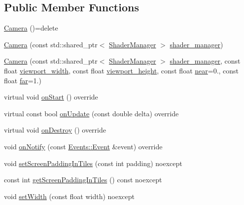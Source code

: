 \subsection*{Public Member Functions}
\begin{DoxyCompactItemize}
\item 
\hyperlink{class_graphics_1_1_camera_a357a2294fe254fc1dd24061336f7fef9}{Camera} ()=delete
\item 
\hyperlink{class_graphics_1_1_camera_a4974bc917c6e7db4a9429e5ce3673b14}{Camera} (const std\+::shared\+\_\+ptr$<$ \hyperlink{class_graphics_1_1_shader_manager}{Shader\+Manager} $>$ \hyperlink{class_graphics_1_1_camera_a60d25d91283365ea01a54a81e0f9246b}{shader\+\_\+manager})
\item 
\hyperlink{class_graphics_1_1_camera_aef6471ed249e435e25bb80bbafad31cf}{Camera} (const std\+::shared\+\_\+ptr$<$ \hyperlink{class_graphics_1_1_shader_manager}{Shader\+Manager} $>$ \hyperlink{class_graphics_1_1_camera_a60d25d91283365ea01a54a81e0f9246b}{shader\+\_\+manager}, const float \hyperlink{class_graphics_1_1_camera_ae08e862d5cf284a8d28a5b5bebdf1d33}{viewport\+\_\+width}, const float \hyperlink{class_graphics_1_1_camera_acc8b30298da1779394bbafb91f5a7855}{viewport\+\_\+height}, const float \hyperlink{class_graphics_1_1_camera_ad4c61e1382447826985b5a5445379375}{near}=0., const float \hyperlink{class_graphics_1_1_camera_a1d6d4c2d74d4d25ef66900bf603e88af}{far}=1.)
\item 
virtual void \hyperlink{class_graphics_1_1_camera_a37edadff497ff3966c2190b876bfe236}{on\+Start} () override
\item 
virtual const bool \hyperlink{class_graphics_1_1_camera_a0bfccb5623342c93f69b408937b87374}{on\+Update} (const double delta) override
\item 
virtual void \hyperlink{class_graphics_1_1_camera_a9d8ca67cbd7a586915fc6cfd303406de}{on\+Destroy} () override
\item 
void \hyperlink{class_graphics_1_1_camera_afd1785008e1ee71690749bf99a5d1e9a}{on\+Notify} (const \hyperlink{class_events_1_1_event}{Events\+::\+Event} \&event) override
\item 
void \hyperlink{class_graphics_1_1_camera_ad0ac1e840142be9747d4601132b99a89}{set\+Screen\+Padding\+In\+Tiles} (const int padding) noexcept
\item 
const int \hyperlink{class_graphics_1_1_camera_aaec05679e857e34c6066487c0bedcdd0}{get\+Screen\+Padding\+In\+Tiles} () const noexcept
\item 
void \hyperlink{class_graphics_1_1_camera_aaccd7b431b1fe0ff34cb5b012a51bfa1}{set\+Width} (const float width) noexcept

\end{DoxyCompactItemize}
